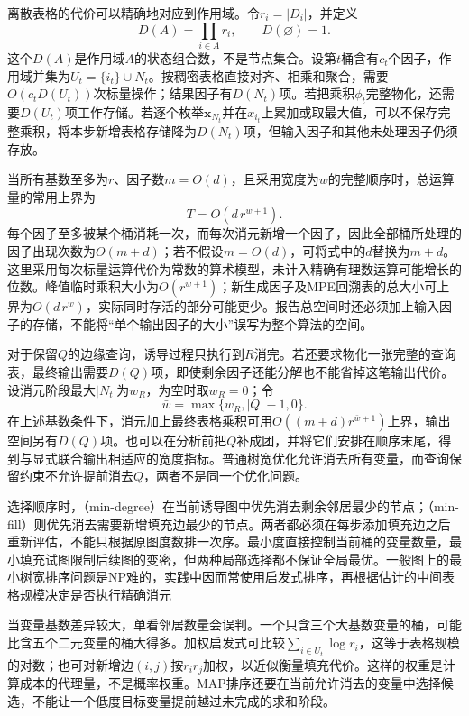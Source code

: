 离散表格的代价可以精确地对应到作用域。令$r_i=|D_i|$，并定义
\[
  D(A)=\prod_{i\in A}r_i,\qquad D(\varnothing)=1.
\]
这个$D(A)$是作用域$A$的状态组合数，不是节点集合。设第$t$桶含有$c_t$个因子，作用域并集为$U_t=\{i_t\}\cup N_t$。按稠密表格直接对齐、相乘和聚合，需要$O(c_tD(U_t))$次标量操作；结果因子有$D(N_t)$项。若把乘积$\phi_t$完整物化，还需要$D(U_t)$项工作存储。若逐个枚举$\bm{x}_{N_t}$并在$x_{i_t}$上累加或取最大值，可以不保存完整乘积，将本步新增表格存储降为$D(N_t)$项，但输入因子和其他未处理因子仍须存放。

当所有基数至多为$r$、因子数$m=O(d)$，且采用宽度为$w$的完整顺序时，总运算量的常用上界为
\begin{equation}
  T=O(d\,r^{w+1}).
  \label{eq:pgm-elimination-discrete-time}
\end{equation}
每个因子至多被某个桶消耗一次，而每次消元新增一个因子，因此全部桶所处理的因子出现次数为$O(m+d)$；若不假设$m=O(d)$，可将式中的$d$替换为$m+d$。这里采用每次标量运算代价为常数的算术模型，未计入精确有理数运算可能增长的位数。峰值临时乘积大小为$O(r^{w+1})$；新生成因子及MPE回溯表的总大小可上界为$O(d\,r^w)$，实际同时存活的部分可能更少。报告总空间时还必须加上输入因子的存储，不能将“单个输出因子的大小”误写为整个算法的空间。

对于保留$Q$的边缘查询，诱导过程只执行到$R$消完。若还要求物化一张完整的查询表，最终输出需要$D(Q)$项，即使剩余因子还能分解也不能省掉这笔输出代价。设消元阶段最大$|N_t|$为$w_R$，为空时取$w_R=0$；令
\[
  \bar w=\max\{w_R,|Q|-1,0\}.
\]
在上述基数条件下，消元加上最终表格乘积可用$O((m+d)r^{\bar w+1})$上界，输出空间另有$D(Q)$项。也可以在分析前把$Q$补成团，并将它们安排在顺序末尾，得到与显式联合输出相适应的宽度指标。普通树宽优化允许消去所有变量，而查询保留约束不允许提前消去$Q$，两者不是同一个优化问题。

选择顺序时，（min-degree）在当前诱导图中优先消去剩余邻居最少的节点；（min-fill）则优先消去需要新增填充边最少的节点。两者都必须在每步添加填充边之后重新评估，不能只根据原图度数排一次序。最小度直接控制当前桶的变量数量，最小填充试图限制后续图的变密，但两种局部选择都不保证全局最优。一般图上的最小树宽排序问题是NP难的，实践中因而常使用启发式排序，再根据估计的中间表格规模决定是否执行精确消元

当变量基数差异较大，单看邻居数量会误判。一个只含三个大基数变量的桶，可能比含五个二元变量的桶大得多。加权启发式可比较$\sum_{i\in U_t}\log r_i$，这等于表格规模的对数；也可对新增边$(i,j)$按$r_ir_j$加权，以近似衡量填充代价。这样的权重是计算成本的代理量，不是概率权重。MAP排序还要在当前允许消去的变量中选择候选，不能让一个低度目标变量提前越过未完成的求和阶段。

